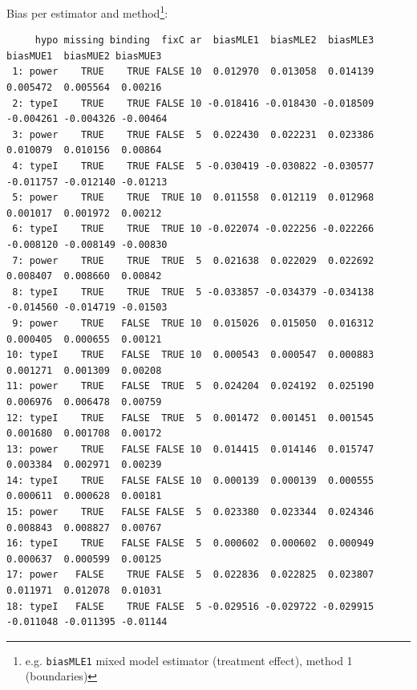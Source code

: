 \documentclass[12pt]{article}
\begin{document}
Bias per estimator and method\footnote{e.g. \texttt{biasMLE1} mixed model
estimator (treatment effect), method 1 (boundaries)}:
\begin{adjustwidth}{-1cm}{-1cm}
\begin{verbatim}
     hypo missing binding  fixC ar  biasMLE1  biasMLE2  biasMLE3  biasMUE1  biasMUE2 biasMUE3
 1: power    TRUE    TRUE FALSE 10  0.012970  0.013058  0.014139  0.005472  0.005564  0.00216
 2: typeI    TRUE    TRUE FALSE 10 -0.018416 -0.018430 -0.018509 -0.004261 -0.004326 -0.00464
 3: power    TRUE    TRUE FALSE  5  0.022430  0.022231  0.023386  0.010079  0.010156  0.00864
 4: typeI    TRUE    TRUE FALSE  5 -0.030419 -0.030822 -0.030577 -0.011757 -0.012140 -0.01213
 5: power    TRUE    TRUE  TRUE 10  0.011558  0.012119  0.012968  0.001017  0.001972  0.00212
 6: typeI    TRUE    TRUE  TRUE 10 -0.022074 -0.022256 -0.022266 -0.008120 -0.008149 -0.00830
 7: power    TRUE    TRUE  TRUE  5  0.021638  0.022029  0.022692  0.008407  0.008660  0.00842
 8: typeI    TRUE    TRUE  TRUE  5 -0.033857 -0.034379 -0.034138 -0.014560 -0.014719 -0.01503
 9: power    TRUE   FALSE  TRUE 10  0.015026  0.015050  0.016312  0.000405  0.000655  0.00121
10: typeI    TRUE   FALSE  TRUE 10  0.000543  0.000547  0.000883  0.001271  0.001309  0.00208
11: power    TRUE   FALSE  TRUE  5  0.024204  0.024192  0.025190  0.006976  0.006478  0.00759
12: typeI    TRUE   FALSE  TRUE  5  0.001472  0.001451  0.001545  0.001680  0.001708  0.00172
13: power    TRUE   FALSE FALSE 10  0.014415  0.014146  0.015747  0.003384  0.002971  0.00239
14: typeI    TRUE   FALSE FALSE 10  0.000139  0.000139  0.000555  0.000611  0.000628  0.00181
15: power    TRUE   FALSE FALSE  5  0.023380  0.023344  0.024346  0.008843  0.008827  0.00767
16: typeI    TRUE   FALSE FALSE  5  0.000602  0.000602  0.000949  0.000637  0.000599  0.00125
17: power   FALSE    TRUE FALSE  5  0.022836  0.022825  0.023807  0.011971  0.012078  0.01031
18: typeI   FALSE    TRUE FALSE  5 -0.029516 -0.029722 -0.029915 -0.011048 -0.011395 -0.01144
\end{verbatim}
\end{adjustwidth}
\end{document}
